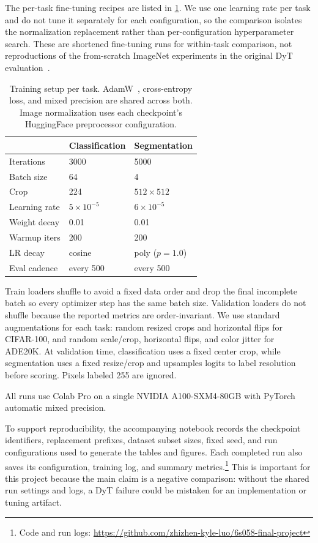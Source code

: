 \documentclass[10pt,twocolumn,letterpaper]{article}
\begin{document}
The per-task fine-tuning recipes are listed in \cref{tab:protocol}. We use one learning rate per task and do not tune it separately for each configuration, so the comparison isolates the normalization replacement rather than per-configuration hyperparameter search. These are shortened fine-tuning runs for within-task comparison, not reproductions of the from-scratch ImageNet experiments in the original DyT evaluation~\cite{zhu2025dyt}.

\begin{table}[!htbp]
\centering
\small
\caption{Training setup per task. AdamW~\cite{loshchilov2019adamw}, cross-entropy loss, and mixed precision are shared across both. Image normalization uses each checkpoint's HuggingFace preprocessor configuration.}
\label{tab:protocol}
\begin{tabular}{lll}
\toprule
& Classification & Segmentation \\
\midrule
Iterations & 3000 & 5000 \\
Batch size & 64 & 4 \\
Crop & 224 & $512{\times}512$ \\
Learning rate & $5{\times}10^{-5}$ & $6{\times}10^{-5}$ \\
Weight decay & 0.01 & 0.01 \\
Warmup iters & 200 & 200 \\
LR decay & cosine & poly ($p{=}1.0$) \\
Eval cadence & every 500 & every 500 \\
\bottomrule
\end{tabular}
\end{table}

Train loaders shuffle to avoid a fixed data order and drop the final incomplete batch so every optimizer step has the same batch size. Validation loaders do not shuffle because the reported metrics are order-invariant. We use standard augmentations for each task: random resized crops and horizontal flips for CIFAR-100, and random scale/crop, horizontal flips, and color jitter for ADE20K. At validation time, classification uses a fixed center crop, while segmentation uses a fixed resize/crop and upsamples logits to label resolution before scoring. Pixels labeled 255 are ignored.

All runs use Colab Pro on a single NVIDIA A100-SXM4-80GB with PyTorch~\cite{paszke2019pytorch} automatic mixed precision.

To support reproducibility, the accompanying notebook records the checkpoint identifiers, replacement prefixes, dataset subset sizes, fixed seed, and run configurations used to generate the tables and figures. Each completed run also saves its configuration, training log, and summary metrics.\footnote{Code and run logs: \url{https://github.com/zhizhen-kyle-luo/6s058-final-project}} This is important for this project because the main claim is a negative comparison: without the shared run settings and logs, a DyT failure could be mistaken for an implementation or tuning artifact.
\end{document}

